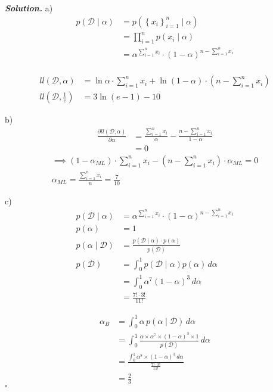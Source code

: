 \documentclass[11pt]{amsart}
\newenvironment{solution}[1][\it{Solution}]{\textbf{#1. } }{$\square$}
\theoremstyle{definition}
\begin{document}
\begin{solution}
a)
\begin{align*}
p(\mathcal{D} \mid \alpha) &= p(\left\{x_i\right\}_{i=1}^{n} \mid \alpha)\\
&= \prod_{i=1}^{n} p(x_i \mid \alpha)\\
&= \alpha^{\sum_{i=1}^{n}x_i} \cdot \left(1-\alpha \right)^{n - \sum_{i=1}^{n}x_i}\\
\end{align*}

\begin{align*}
ll\left(\mathcal{D}, \alpha\right) &= \ln \alpha \cdot \sum_{i=1}^{n}x_i + \ln \left(1-\alpha \right) \cdot \left(n-\sum_{i=1}^{n}x_i\right)\\
ll\left(\mathcal{D}, \frac{1}{e}\right) &= 3\ln\left(e-1\right)-10
\end{align*}

b)
\begin{align*}
\frac{\partial ll\left(\mathcal{D}, \alpha\right)}{\partial \alpha} &= \frac{\sum_{i=1}^{n}x_i}{\alpha} - \frac{n-\sum_{i=1}^{n}x_i}{1-\alpha}\\
&=0
\end{align*}
\begin{align*}
\implies \left(1-\alpha_{ML} \right) \cdot \sum_{i=1}^{n}x_i - \left(n - \sum_{i=1}^{n} x_i \right) \cdot \alpha_{ML} = 0\\
\alpha_{ML} = \frac{\sum_{i=1}^{n}x_i}{n} = \boxed {\frac{7}{10}}
\end{align*}

c)
\begin{align*}
p\left(\mathcal{D}\mid\alpha\right) &= \alpha^{\sum_{i=1}^{n}x_i} \cdot (1-\alpha)^{n-\sum_{i=1}^{n}x_i}\\
p\left(\alpha\right) &= 1\\
p\left(\alpha \mid \mathcal{D}\right) &= \frac{p\left(\mathcal{D} \mid \alpha \right) \cdot p\left(\alpha\right)}{p\left( \mathcal{D} \right)}\\
p\left( \mathcal{D} \right) &= \int_{0}^{1} p\left(\mathcal{D} \mid \alpha \right) p\left(\alpha \right)\,d\alpha\\
&=\int_{0}^{1} \alpha^7 \left(1-\alpha\right)^3 \, d\alpha\\
&=\frac{7!\cdot3!}{11!}
\end{align*}

\begin{align*}
\alpha_{B} &= \int_{0}^{1} \alpha \, p\left(\alpha \mid \mathcal{D}\right) \, d\alpha\\
&= \int_{0}^{1}\frac{\alpha \times \alpha^7 \times \left(1-\alpha\right)^{3} \times 1}{p\left(\mathcal{D}\right)} \, d\alpha\\
&= \frac{\int_{0}^{1}\alpha^8 \times \left(1-\alpha \right)^{3} \, d\alpha}{\frac{7! \cdot 3!}{11!}}\\
&= \boxed{\frac{2}{3}}
\end{align*}
\end{solution}
\end{document}
